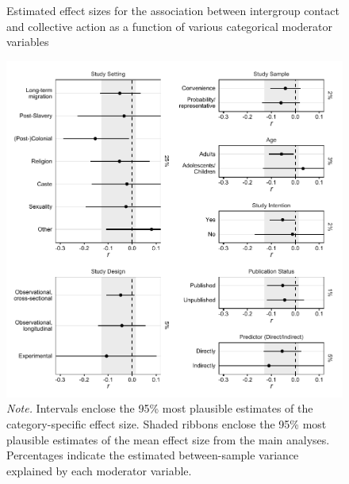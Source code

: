 \documentclass[12pt, letterpaper]{article}
\begin{document}
\begin{figure}
\centering
\caption{Estimated effect sizes for the association between intergroup contact and collective action as a function of various categorical moderator variables}
\includegraphics[scale=1]{../figures/figure-s1}
\caption*{\textit{Note.} Intervals enclose the 95\% most plausible estimates of the category-specific effect size. Shaded ribbons enclose the 95\% most plausible estimates of the mean effect size from the main analyses. Percentages indicate the estimated between-sample variance explained by each moderator variable.}
\label{fig:s1}
\end{figure}
\end{document}

